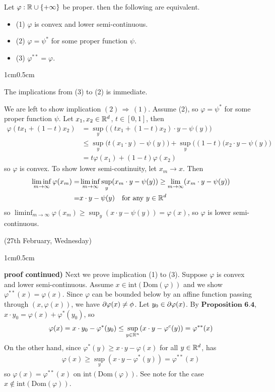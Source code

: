 \documentclass[12pt,a4paper]{article}
\newenvironment{proof}
{\begin{changemargin}{1cm}{0.5cm} 
	}%
	{\end{changemargin}
}
\renewenvironment{i}
{\begin{itemize} 
	}%
	{\end{itemize}
}
\newenvironment{p}
{\begin{proof} 
	}%
	{\end{proof}
}
\begin{document}
 Let $\varphi : \mathbb{R} \cup \{+\infty \}$ be proper. then the following are equivalent.
\begin{i}
\item[(1)] $\varphi$ is convex and lower semi-continuous.
\item[(2)] $\varphi = \psi^*$ for some proper function $\psi$.
\item[(3)] $\varphi^{**} = \varphi$.
\end{i}
\begin{p}
\pf The implications from (3) to (2) is immediate.

\quad We are left to show implication $(2)\, \Rightarrow \,(1)$. Assume (2), so $\varphi = \psi^*$ for some proper function $\psi$. Let $x_1, x_2\in \mathbb{R}^d$, $t\in [0,1]$, then 
\begin{align*}
\varphi(tx_1 + (1-t)x_2) & = \sup_y \big( (tx_1 +(1-t)x_2)\cdot y - \psi(y) \big) \\
& \leq \sup_y \big( t(x_1 \cdot y) - \psi(y) \big) + \sup_y \big((1-t)(x_2 \cdot y - \psi(y) \big) \\
& = t\varphi(x_1) + (1-t) \varphi(x_2)
\end{align*}  
so $\varphi$ is convex. To show lower semi-continuity, let $x_m \rightarrow x$. Then
\begin{align*}
\liminf_{m\rightarrow \infty} \varphi(x_m) =& \liminf_{m\rightarrow \infty} \sup_y (x_m \cdot y -\psi(y)) \geq \lim_{m\rightarrow \infty} (x_m \cdot y - \psi(y)) \\
=& x\cdot y - \psi(y) \quad \text{for any } y\in \mathbb{R}^d
\end{align*}
so $\liminf_{m\rightarrow \infty} \varphi(x_m) \geq \sup_y (x\cdot y - \psi(y)) = \varphi(x)$, so $\varphi$ is lower semi-continuous.
\end{p}
\s

\newday

(27th February, Wednesday)
\s

\begin{p}
\textbf{proof continued)} Next we prove implication (1) to (3). Suppose $\varphi$ is convex and lower semi-continuous. Assume $x\in \text{int}(\text{Dom}(\varphi))$ and we show $\varphi^{**}(x) = \varphi(x)$. Since $\varphi$ can be bounded below by an affine function passing through $(x, \varphi(x))$, we have $\partial \varphi(x) \neq \phi$. Let $y_0 \in \partial \varphi(x)$. By $\textbf{Proposition 6.4}$, $x\cdot y_0 = \varphi(x) + \varphi^*(y_0)$, so
\begin{align*}
\varphi(x) = x\cdot y_0 - \varphi^*(y_0) \leq \sup_{y\in \mathbb{R}^n} (x\cdot y - \varphi^c(y)) =  \varphi^{**}(x)
\end{align*}
On the other hand, since $\varphi^*(y) \geq x\cdot y - \varphi(x)$ for all $y\in \mathbb{R}^d$, has 
\begin{align*}
\varphi(x) \geq \sup_y (x\cdot y - \varphi^*(y)) = \varphi^{**}(x)
\end{align*}
so $\varphi(x) = \varphi^{**}(x)$ on $\text{int}(\text{Dom}(\varphi))$. See note for the case $x\not\in \text{int}(\text{Dom}(\varphi))$.

\eop
\end{p}
\end{document}
